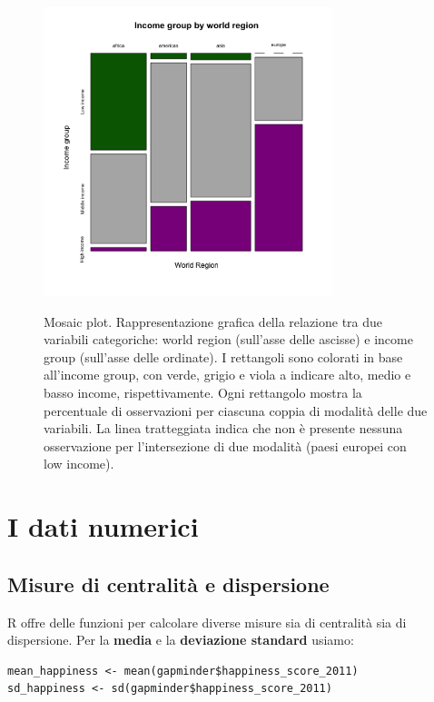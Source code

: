\begin{figure}[h]
 \centering
  \includegraphics[width=0.75\textwidth]{images/mosaic_plot.png}
  \label{fig:mosaic}
 \caption{Mosaic plot. Rappresentazione grafica della relazione tra due variabili categoriche: world region (sull'asse delle ascisse) e income group (sull'asse delle ordinate). I rettangoli sono colorati in base all'income group, con verde, grigio e viola a indicare alto, medio e basso income, rispettivamente. Ogni rettangolo mostra la percentuale di osservazioni per ciascuna coppia di modalit\`a delle due variabili. La linea tratteggiata indica che non \`e presente nessuna osservazione per l'intersezione di due modalit\`a (paesi europei con low income).}
\end{figure}

\section{I dati numerici}

\subsection{Misure di centralit\`a e dispersione}
\label{sec:centdisp}

R offre delle funzioni per calcolare diverse misure sia di  centralit\`a sia di dispersione. Per la \textbf{media} e la \textbf{deviazione standard} usiamo:

\begin{lstlisting}[style=Rstylescript]
mean_happiness <- mean(gapminder$happiness_score_2011)
sd_happiness <- sd(gapminder$happiness_score_2011)
\end{lstlisting}

